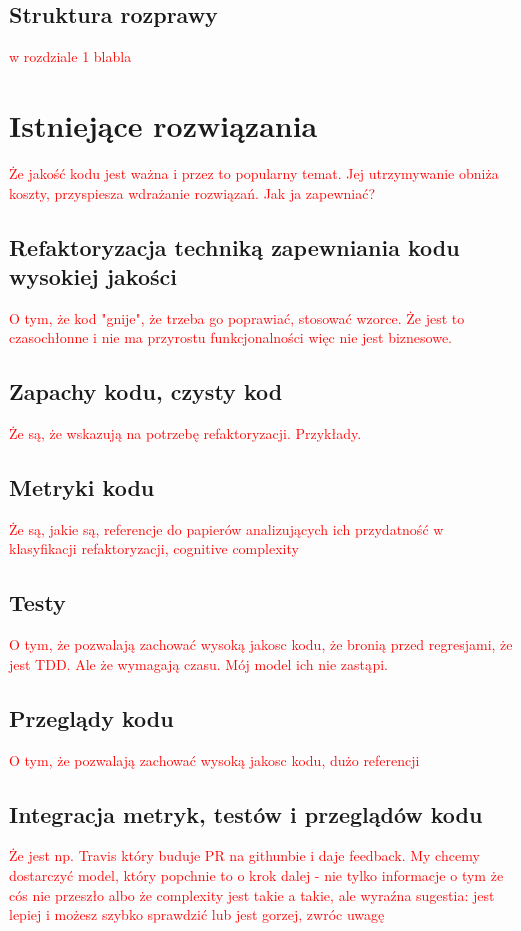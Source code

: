 \documentclass[12pt]{report}
\begin{document}
\section{Struktura rozprawy}
\textcolor{red}{w rozdziale 1 blabla}


\chapter{Istniejące rozwiązania}

\textcolor{red}{Że jakość kodu jest ważna i przez to popularny temat. Jej utrzymywanie obniża koszty,
przyspiesza wdrażanie rozwiązań. Jak ja zapewniać?}

\section{Refaktoryzacja techniką zapewniania kodu wysokiej jakości}
\textcolor{red}{O tym, że kod "gnije", że trzeba go poprawiać, stosować wzorce. Że jest to czasochłonne i nie ma przyrostu funkcjonalności więc nie jest biznesowe.}

\section{Zapachy kodu, czysty kod}
\label{sec:existing:smells}
\textcolor{red}{Że są, że wskazują na potrzebę refaktoryzacji. Przykłady.}

\section{Metryki kodu}
\textcolor{red}{Że są, jakie są, referencje do papierów analizujących ich przydatność w klasyfikacji refaktoryzacji, cognitive complexity}

\section{Testy}
\textcolor{red}{O tym, że pozwalają zachować wysoką jakosc kodu, że bronią przed regresjami, że jest TDD. Ale że wymagają czasu. Mój model ich nie zastąpi.}



\section{Przeglądy kodu}
\textcolor{red}{O tym, że pozwalają zachować wysoką jakosc kodu, dużo referencji}

\section{Integracja metryk, testów i przeglądów kodu}
\textcolor{red}{Że jest np. Travis który buduje PR na githunbie i daje feedback. My chcemy dostarczyć model, który popchnie to o krok dalej - nie tylko informacje o tym że cós nie przeszło albo że complexity jest takie a takie, ale wyraźna sugestia: jest lepiej i możesz szybko sprawdzić lub jest gorzej, zwróc uwagę}
% 
% 
\end{document}
